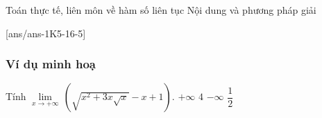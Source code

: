 \begin{dang}{Toán thực tế, liên môn về hàm số liên tục}
	Nội dung và phương pháp giải
\end{dang}
[ans/ans-1K5-16-5]
\subsubsection{Ví dụ minh hoạ}
\setcounter{vd}{0}
\begin{vd}%
	Tính $\underset{x\to +\infty}{\mathop{\lim}}\,\left( \sqrt{x^2+3x\sqrt{x}}-x+1 \right)$.
	\choice
	{\True $+\infty$}
	{$4$}
	{$-\infty$}
	{$\dfrac{1}{2}$}
\end{vd}



